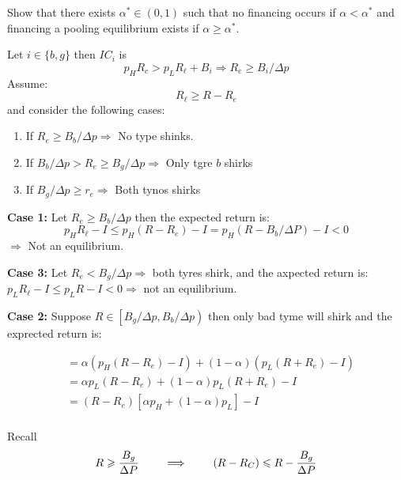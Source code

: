 \documentclass[12pt]{article}
\begin{document}
    \begin{subexercise}
        Show that there exists $\alpha^{*} \in(0,1)$ such that no financing occurs if $\alpha<\alpha^{*}$ and financing a pooling equilibrium
        exists if $\alpha \geq \alpha^{*}$.
    \end{subexercise}
    \begin{answer}
        Let $i \in\{b, g\}$ then $IC_{i}$ is
            \[ 
                p_H R_{c}>p_L R_{\ell}+B_{i} \Rightarrow R_{e} \geqslant B_{i} / \Delta p
            \]
        Assume:       
                $$ R_{\ell} \geqslant R-R_{e}$$
        and consider the following cases:
        \begin{enumerate}
            \item If $R_{e} \geqslant B_{b} / \Delta p  \Rightarrow$ No type shinks.
            \item If $B_b / \Delta p > R_{e} \geqslant B_{g} / \Delta p \Rightarrow$ Only tgre $b$ shirks
            \item If $B_{g} / \Delta p \geqslant r_{e} \Rightarrow$ Both tynos shirks
        \end{enumerate}
    
        \textbf{Case 1:} Let $R_{e} \geqslant B_{b} / \Delta p$ then the expected return is:
        $$
        p_H R_{\ell} - I \leq p_H\left(R-R_{e}\right)-I=p_H\left(R-B_{b} / \Delta P\right)-I<0
        $$
        $\Rightarrow$ Not an equilibrium.

        \textbf{Case 3:} Let $R_{e}<B_{g} / \Delta p \Rightarrow$ both tyres shirk, and the axpected return is:
        $p_L R_{\ell}-I \leq p_L R-I < 0 \Rightarrow $ not an equilibrium.
        
        \textbf{Case 2:} Suppose $R \in\left[B_{g} / \Delta p, B_{b} / \Delta p\right)$ then only bad tyme will shirk and the exprected return is:

        \begin{align*}
            &=\alpha\left(p_H\left(R-R_{e}\right)-I\right)+(1-\alpha)\left(p_L\left(R+R_{e}\right)-I\right) \\
            &=\alpha p_L\left(R-R_{e}\right)+(1-\alpha) p_L\left(R+R_{e}\right)-I \\
            &=\left(R-R_{e}\right)\left[\alpha p_H+(1-\alpha) p_L\right]-I \\
        \end{align*}
        
        Recall $$R  \geqslant \frac{B_{g}}{\Delta P} \qquad \implies \qquad \left(R-R_{C}\right) \leqslant R-\frac{B_{g}}{\Delta P} $$


\end{answer}
\end{document}
